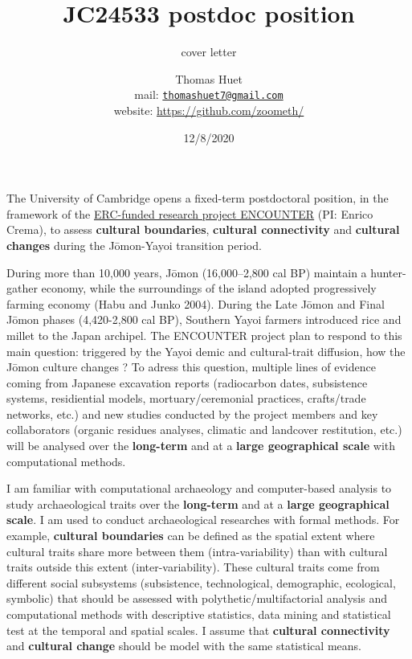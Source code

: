 \documentclass[
]{article}
\title{JC24533 postdoc position}
\subtitle{cover letter}
\author{Thomas Huet\\
mail:
\href{mailto:thomashuet7@gmail.com}{\nolinkurl{thomashuet7@gmail.com}}\\
website: \url{https://github.com/zoometh/}}
\date{12/8/2020}
\begin{document}
\maketitle

The University of Cambridge opens a fixed-term postdoctoral position, in
the framework of the
\href{https://www.encounterproject.info/}{ERC-funded research project
ENCOUNTER} (PI: Enrico Crema), to assess \textbf{cultural boundaries},
\textbf{cultural connectivity} and \textbf{cultural changes} during the
Jōmon-Yayoi transition period.

During more than 10,000 years, Jōmon (16,000--2,800 cal BP) maintain a
hunter-gather economy, while the surroundings of the island adopted
progressively farming economy (Habu and Junko 2004). During the Late
Jōmon and Final Jōmon phases (4,420-2,800 cal BP), Southern Yayoi
farmers introduced rice and millet to the Japan archipel. The ENCOUNTER
project plan to respond to this main question: triggered by the Yayoi
demic and cultural-trait diffusion, how the Jōmon culture changes ? To
adress this question, multiple lines of evidence coming from Japanese
excavation reports (radiocarbon dates, subsistence systems, residiential
models, mortuary/ceremonial practices, crafts/trade networks, etc.) and
new studies conducted by the project members and key collaborators
(organic residues analyses, climatic and landcover restitution, etc.)
will be analysed over the \textbf{long-term} and at a \textbf{large
geographical scale} with computational methods.

I am familiar with computational archaeology and computer-based analysis
to study archaeological traits over the \textbf{long-term} and at a
\textbf{large geographical scale}. I am used to conduct archaeological
researches with formal methods. For example, \textbf{cultural
boundaries} can be defined as the spatial extent where cultural traits
share more between them (intra-variability) than with cultural traits
outside this extent (inter-variability). These cultural traits come from
different social subsystems (subsistence, technological, demographic,
ecological, symbolic) that should be assessed with
polythetic/multifactorial analysis and computational methods with
descriptive statistics, data mining and statistical test at the temporal
and spatial scales. I assume that \textbf{cultural connectivity} and
\textbf{cultural change} should be model with the same statistical
means.
\end{document}
